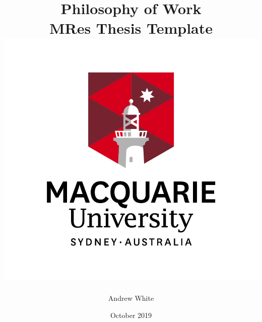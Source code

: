 



\title{{Philosophy of Work}\\ 
{\large MRes Thesis Template}\\
{\includegraphics{MQ_INT_VER_RGB_POS.PNG}}
}
\author{Andrew White} %
\date{October 2019} %


